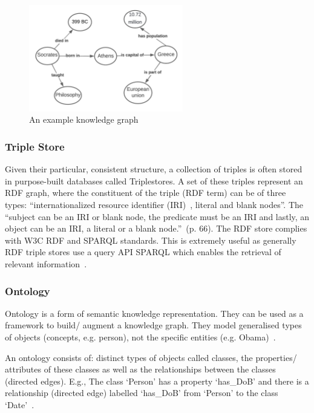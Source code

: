 \begin{figure}[H]
    \centering
    \includegraphics[width=0.6\textwidth]{images/eg_kg.png}
    \caption{An example knowledge graph}
    \label{example_kg}
\end{figure}

\subsubsection{Triple Store}

Given their particular, consistent structure, a collection of triples is often stored in purpose-built databases called Triplestores. A set of these triples represent an RDF graph, where the constituent of the triple (RDF term) can be of three types: ``internationalized resource identifier (IRI)~\cite{internationalized}, literal and blank nodes''. The ``subject can be an IRI or blank node, the predicate must be an IRI and lastly, an object can be an IRI, a literal or a blank node.''~\cite{6_world2014rdf}(p. 66). The RDF store complies with  W3C RDF and SPARQL standards. This is extremely useful as generally RDF triple stores use a query API SPARQL which enables the retrieval of relevant information~\cite{8_berven2020knowledge}.

\subsubsection{Ontology}

Ontology is a form of semantic knowledge representation. They can be used as a framework to build/ augment a knowledge graph. They model generalised types of objects (concepts, e.g. person), not the specific entities (e.g. Obama)~\cite{4_towards_kg}.

An ontology consists of: distinct types of objects called classes, the properties/ attributes of these classes as well as the relationships between the classes (directed edges). E.g., The class `Person' has a property `has\_DoB' and there is a relationship (directed edge) labelled `has\_DoB' from `Person' to the class `Date'~\cite{4_towards_kg}.

